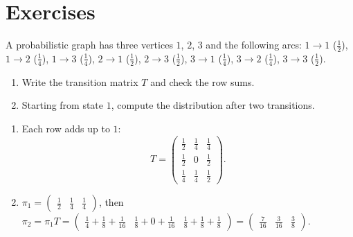 \section{Exercises}
\begin{exercise}
A probabilistic graph has three vertices $1$, $2$, $3$ and the following arcs: $1\to1$ ($\frac12$), $1\to2$ ($\frac14$), $1\to3$ ($\frac14$), $2\to1$ ($\frac12$), $2\to3$ ($\frac12$), $3\to1$ ($\frac14$), $3\to2$ ($\frac14$), $3\to3$ ($\frac12$).
\begin{enumerate}
\item Write the transition matrix $T$ and check the row sums.
\item Starting from state $1$, compute the distribution after two transitions.
\end{enumerate}
\end{exercise}
\begin{solution}
\begin{enumerate}
\item Each row adds up to $1$: \[T=\begin{pmatrix}\frac12&\frac14&\frac14\\\frac12&0&\frac12\\\frac14&\frac14&\frac12\end{pmatrix}.\]
\item $\pi_1=\begin{pmatrix}\frac12&\frac14&\frac14\end{pmatrix}$, then $\pi_2=\pi_1T=\begin{pmatrix}\frac14+\frac18+\frac1{16}&\frac18+0+\frac1{16}&\frac18+\frac18+\frac18\end{pmatrix}=\begin{pmatrix}\frac7{16}&\frac3{16}&\frac38\end{pmatrix}$.
\end{enumerate}
\end{solution}

